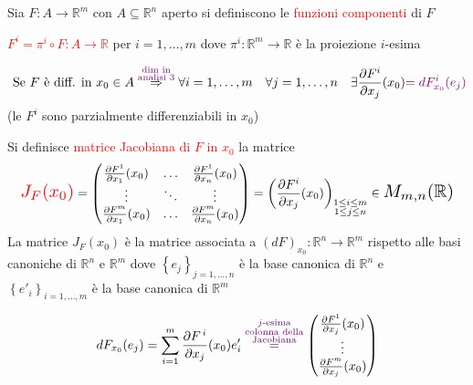         \begin{definizione}
        Sia $F:A \to \mathbb{R}^m$ con $A \subseteq \mathbb{R}^n$ aperto si definiscono le \textcolor{red}{funzioni componenti} di $F$ 

        \textcolor{red}{$F^i = \pi^i \circ F : A \to \mathbb{R}$} per $i=1,\ldots,m$ dove $\pi^i: \mathbb{R}^m \to \mathbb{R}$ è la proiezione 
        $i$-esima 

        \begin{equation} 
        \label{eq:differenziale_con_derivate_parziali}
        \text{ Se } F \text{ è diff. in } x_0 \in A \overset{\textcolor{violet}{\substack{\text{dim in} \\ \text{analisi 3} }}}{\Rightarrow} \forall i=1,\ldots,m \quad \forall j=1,\ldots,n \quad \exists \frac{\partial F^i}{\partial x_j}(x_0) \textcolor{violet}{= dF^i_{x_0}(e_j)} 
        \end{equation}
        \textcolor{blu}{(le $F^i$ sono parzialmente differenziabili in $x_0$)}
        
        Si definisce \textcolor{red}{matrice Jacobiana di $F$ in $x_0$} la matrice 
        \[ \textcolor{red}{\text{\scalebox{1.4}{\text{$J_F(x_0)$}}}} = \begin{pmatrix} \frac{\partial F^1}{\partial x_1}(x_0) & \ldots & \frac{\partial F^1}{\partial x_n}(x_0) \\
        \vdots & \ddots & \vdots \\
        \frac{\partial F^m}{\partial x_1}(x_0) & \ldots & \frac{\partial F^m}{\partial x_n}(x_0) \end{pmatrix} = \left( \frac{\partial F^i}{\partial x_j}(x_0) \right)_{\substack{1 \leq i \leq m \\ 1 \leq j \leq n}} \in \scalebox{1.4}{\text{$M_{m,n}(\mathbb{R})$}} \]
        La matrice $J_F(x_0)$ è la matrice associata a $\left(dF\right)_{x_0}: \mathbb{R}^n \to \mathbb{R}^m$ rispetto alle basi canoniche di $\mathbb{R}^n$ e $\mathbb{R}^m$ 
        dove $\left\{e_j\right\}_{j=1,\ldots,n}$ è la base canonica di $\mathbb{R}^n$ e
        $\left\{e'_i\right\}_{i=1,\ldots,m}$ è la base canonica di $\mathbb{R}^m$
        
        \[  dF_{x_0}(e_j) = \sum_{i=1}^m \frac{\partial F^{\, i}}{\partial x_j}(x_0) e'_i \overset{\textcolor{violet}{\substack{j\text{-esima} \\ \text{colonna della} \\ \text{Jacobiana}}}}{=} \begin{pmatrix}
        \frac{\partial F^1}{\partial x_j}(x_0) \\
        \vdots \\
        \frac{\partial F^m}{\partial x_j}(x_0)
        \end{pmatrix} \]
        

\end{definizione}
